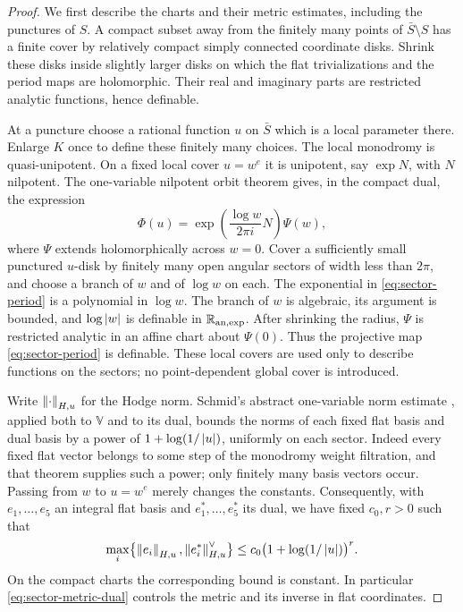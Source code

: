 \begin{proof}
We first describe the charts and their metric estimates, including the
punctures of $S$.  A compact subset away from the finitely many points of
$\bar S\setminus S$ has a finite cover by relatively compact simply
connected coordinate disks.  Shrink these disks inside slightly larger
disks on which the flat trivializations and the period maps are
holomorphic.  Their real and imaginary parts are restricted analytic
functions, hence definable.

At a puncture choose a rational function $u$ on $\bar S$ which is a local
parameter there.  Enlarge $K$ once to define these finitely many choices.
The local monodromy is quasi-unipotent.  On a fixed local cover
$u=w^e$ it is unipotent, say $\exp N$, with $N$ nilpotent.  The
one-variable nilpotent orbit theorem
\cite[Theorem~4.9]{Schmid1973} gives, in the compact dual, the expression
\begin{equation}\label{eq:sector-period}
 \Phi(u)=
 \exp\left(\frac{\log w}{2\pi i}N\right)\Psi(w),
\end{equation}
where $\Psi$ extends holomorphically across $w=0$.  Cover a sufficiently
small punctured $u$-disk by finitely many open angular sectors of width
less than $2\pi$, and choose a branch of $w$ and of $\log w$ on each.
The exponential in \eqref{eq:sector-period} is a polynomial in $\log w$.
The branch of $w$ is algebraic, its argument is bounded, and
$\log\left\lvert w\right\rvert$ is definable in $\mathbb R_{\mathrm{an},\exp}$.  After shrinking
the radius, $\Psi$ is restricted analytic in an affine chart about
$\Psi(0)$.  Thus the projective map \eqref{eq:sector-period} is
definable.  These local covers are used only to describe functions on
the sectors; no point-dependent global cover is introduced.

Write $\left\lVert\cdot\right\rVert_{H,u}$ for the Hodge norm.  Schmid's abstract
one-variable norm estimate
\cite[Theorem~6.6$'$]{Schmid1973}, applied both to $\mathbb V$ and to its
dual, bounds the norms of each fixed flat basis and dual basis by a
power of $1+\log(1/\left\lvert u\right\rvert)$, uniformly on each sector.  Indeed every
fixed flat vector belongs to some step of the monodromy weight
filtration, and that theorem supplies such a power; only finitely many
basis vectors occur.  Passing from $w$ to $u=w^e$ merely changes the
constants.  Consequently, with $e_1,\ldots,e_5$ an integral flat basis
and $e_1^*,\ldots,e_5^*$ its dual, we have fixed $c_0,r>0$ such that
\begin{equation}\label{eq:sector-metric-dual}
 \max_i\bigl\{\left\lVert e_i\right\rVert_{H,u},
                  \left\lVert e_i^*\right\rVert_{H,u}^{\vee}\bigr\}
 \le c_0\bigl(1+\log(1/\left\lvert u\right\rvert)\bigr)^r.
\end{equation}
On the compact charts the corresponding bound is constant.  In
particular \eqref{eq:sector-metric-dual} controls the metric and its
inverse in flat coordinates.


\end{proof}
